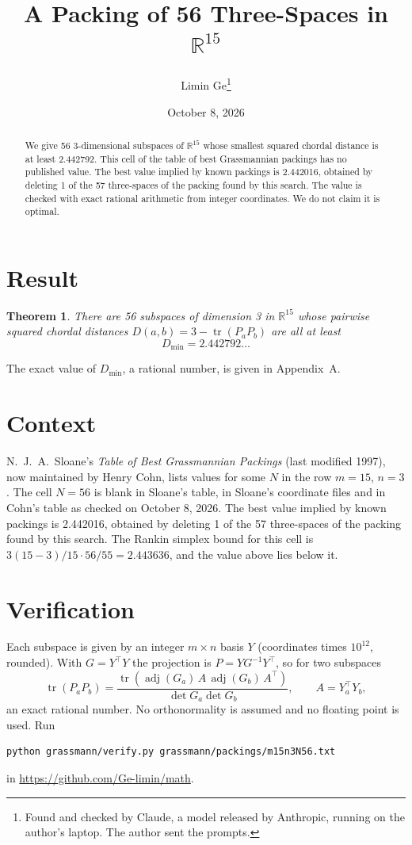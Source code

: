 \documentclass[11pt,a4paper]{article}
\title{A Packing of 56 Three-Spaces in $\mathbb{R}^{15}$}
\author{Limin Ge\thanks{Found and checked by Claude, a model released by Anthropic, running on the author's laptop. The author sent the prompts.}}
\date{October 8, 2026}
\newtheorem*{theorem}{Theorem}
\begin{document}
\maketitle
\begin{abstract}
We give 56 3-dimensional subspaces of $\mathbb{R}^{15}$ whose smallest squared chordal distance is at least 2.442792. This cell of the table of best Grassmannian packings has no published value. The best value implied by known packings is 2.442016, obtained by deleting 1 of the 57 three-spaces of the packing found by this search. The value is checked with exact rational arithmetic from integer coordinates. We do not claim it is optimal.
\end{abstract}

\section{Result}
\begin{theorem}
There are 56 subspaces of dimension 3 in $\mathbb{R}^{15}$ whose pairwise squared chordal distances $D(a,b) = 3 - \operatorname{tr}(P_aP_b)$ are all at least
\[ D_{\min} = 2.442792\ldots \]
\end{theorem}
The exact value of $D_{\min}$, a rational number, is given in Appendix~A.


\section{Context}
N.~J.~A.~Sloane's \emph{Table of Best Grassmannian Packings} (last modified 1997), now maintained by Henry Cohn, lists values for some $N$ in the row $m=15$, $n=3$. The cell $N=56$ is blank in Sloane's table, in Sloane's coordinate files and in Cohn's table as checked on October 8, 2026. The best value implied by known packings is 2.442016, obtained by deleting 1 of the 57 three-spaces of the packing found by this search. The Rankin simplex bound for this cell is $3(15-3)/15\cdot 56/55 = 2.443636$, and the value above lies below it.


\section{Verification}
Each subspace is given by an integer $m\times n$ basis $Y$ (coordinates times $10^{12}$, rounded). With $G=Y^\top Y$ the projection is $P=YG^{-1}Y^\top$, so for two subspaces
\[ \operatorname{tr}(P_aP_b)=\frac{\operatorname{tr}(\operatorname{adj}(G_a)\,A\,\operatorname{adj}(G_b)\,A^\top)}{\det G_a\det G_b},\qquad A=Y_a^\top Y_b, \]
an exact rational number. No orthonormality is assumed and no floating point is used. Run
\begin{verbatim}
python grassmann/verify.py grassmann/packings/m15n3N56.txt
\end{verbatim}
in \url{https://github.com/Ge-limin/math}.
\end{document}
